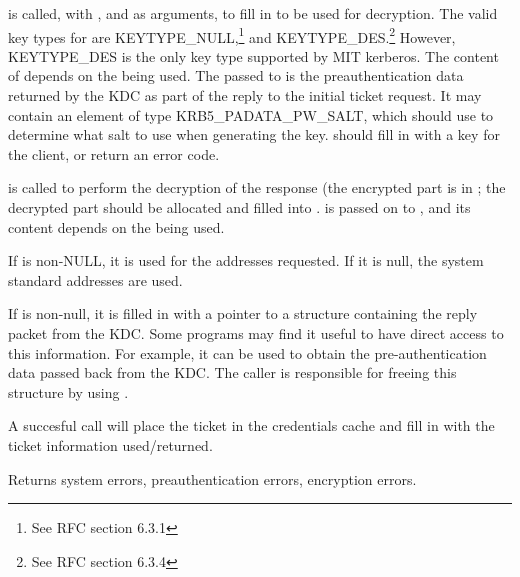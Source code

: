  is called, with ,
 and as arguments, to fill in  to be used for
decryption.  The valid key types for  are
KEYTYPE_NULL,\footnote{See RFC section 6.3.1} and
KEYTYPE_DES.\footnote{See RFC section 6.3.4}  However, KEYTYPE_DES is
the only key type supported by MIT kerberos.
The content of   
depends on the  being used. %
The  passed
to  is the preauthentication data returned by the
KDC as part of the reply to the initial ticket request.  It may
contain an element of type KRB5_PADATA_PW_SALT, which
 should use to determine what salt to use when
generating the key.   should fill in
 with a key for the client, or return an error code.

 is called to perform the decryption of the
response (the encrypted part is in
; the decrypted part should be
allocated and filled into
.
 is passed on to , and
its content depends on the  being used.

If  is non-NULL, it is used for the addresses
requested.  If it is null, the system standard addresses are used.

If  is non-null, it is filled in with a
pointer to a structure containing the reply packet from the KDC.  Some
programs may find it useful to have direct access to this information.
For example, it can be used to obtain the pre-authentication data
passed back from the KDC.  The caller is responsible for freeing this
structure by using .

A succesful call will place the ticket in the credentials cache
 and fill in  with the ticket
information used/returned.

Returns system errors, preauthentication errors, encryption errors.


